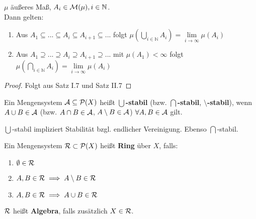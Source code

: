 \documentclass[11pt,a4paper,fleqn,openany]{report}
\begin{document}
    \begin{lemma}
      $\mu$ äußeres Maß, $A_i \in \mathcal{M}(\mu), i \in \mathbb{N}$.\\
      Dann gelten:
      \begin{enumerate}[label=\roman*)]
        \item Aus $A_1 \subseteq ... \subseteq A_i \subseteq A_{i+1} \subseteq ...$ folgt $\mu(\bigcup\limits_{i \in \mathbb{N}} A_i) = \lim\limits_{i \to \infty} \mu(A_i)$
        \item Aus $A_1 \supseteq ... \supseteq A_i \supseteq A_{i+1} \supseteq ...$ mit $\mu(A_1) < \infty$ folgt $\mu(\bigcap\limits_{i \in \mathbb{N}} A_i) = \lim\limits_{i \to \infty} \mu(A_i)$
      \end{enumerate} 
    \end{lemma}
    
    \begin{proof}
      Folgt aus Satz I.7 und Satz II.7
    \end{proof}

    \begin{definition}
      Ein Mengensystem $\mathcal{A} \subseteq \mathcal{P}(X)$ heißt $\bm{\bigcup}$\textbf{-stabil} (bzw. $\bm{\bigcap}$\textbf{-stabil}, $\bm{\setminus}$\textbf{-stabil}), wenn $A \cup B \in \mathcal{A}$ (bzw. $A \cap B \in \mathcal{A}$, $A \setminus B \in \mathcal{A}$) $\forall A,B \in \mathcal{A}$ gilt.
    \end{definition}

    \begin{remark}
      $\bigcup$-stabil impliziert Stabilität bzgl. endlicher Vereinigung. Ebenso $\bigcap$-stabil.
    \end{remark}

    \begin{definition}
      Ein Mengensystem $\mathcal{R}\subset\mathcal{P}(X)$ heißt \textbf{Ring} über $X$, falls:
      \begin{enumerate}[label=\roman*)]
        \item $\emptyset \in \mathcal{R}$
        \item $A,B \in \mathcal{R} \implies A \setminus B \in \mathcal{R}$
        \item $A,B \in \mathcal{R} \implies A \cup B \in \mathcal{R}$
      \end{enumerate}
      
      $\mathcal{R}$ heißt \textbf{Algebra}, falls zusätzlich $X \in \mathcal{R}$.
    \end{definition}
\end{document}
